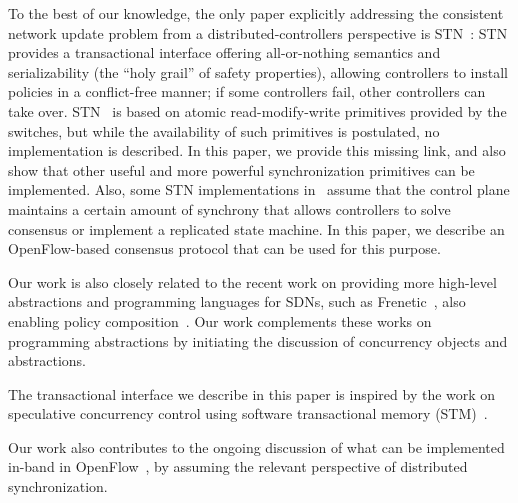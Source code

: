 \documentclass[conference]{sigcomm-alternate}
\newcommand{\hide}[1]{}
\begin{document}
{To the best of our knowledge, the only paper explicitly addressing the consistent
network update problem from a distributed-controllers perspective is STN~\cite{stn}:
STN provides a transactional interface offering all-or-nothing semantics and serializability
(the ``holy grail'' of safety properties), allowing
controllers to install policies in a conflict-free manner; if some controllers fail,
other controllers can take over. STN~\cite{stn} is based on
atomic read-modify-write primitives provided by the switches, but
while the availability of such primitives is postulated, no implementation is
described. In this paper, we provide this missing link, and also show that other useful and
more powerful synchronization primitives can be implemented.
Also, some STN implementations in~\cite{stn} assume that the control
plane maintains a certain amount of synchrony that allows controllers
to solve consensus or implement a replicated state machine.
In this paper, we describe an OpenFlow-based consensus protocol that
can be used for this purpose.

Our work is also closely related to the recent work on providing more high-level
abstractions and programming languages for SDNs, such as Frenetic~\cite{frenetic},
also enabling policy composition~\cite{pyretic}. Our work complements these works
on programming abstractions
by initiating the discussion of concurrency objects and abstractions.

The transactional interface we describe in this paper is inspired by the
work on speculative concurrency control using software transactional memory
(STM)~\cite{stm-st95,tm-book}.

Our work also contributes to the ongoing discussion of what can be implemented
in-band in OpenFlow~\cite{compute,reclaim}, by assuming the relevant perspective of distributed
synchronization.

\hide{
In terms of distributed computing: TODO PETR: maybe modify a bit the text below
and also write more about multi-writer consensus etc.?

}}
\end{document}
